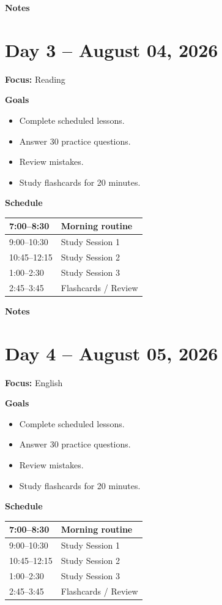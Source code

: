 \vspace{1em}
\textbf{Notes}

\vspace{8cm}

\newpage

\section*{Day 3 -- August 04, 2026}
\textbf{Focus:} Reading

\textbf{Goals}
\begin{itemize}
\item Complete scheduled lessons.
\item Answer 30 practice questions.
\item Review mistakes.
\item Study flashcards for 20 minutes.
\end{itemize}

\textbf{Schedule}
\begin{tabular}{|p{4cm}|p{10cm}|}\hline
7:00--8:30 & Morning routine \\\hline
9:00--10:30 & Study Session 1 \\\hline
10:45--12:15 & Study Session 2 \\\hline
1:00--2:30 & Study Session 3 \\\hline
2:45--3:45 & Flashcards / Review \\\hline
\end{tabular}

\vspace{1em}
\textbf{Notes}

\vspace{8cm}

\newpage

\section*{Day 4 -- August 05, 2026}
\textbf{Focus:} English

\textbf{Goals}
\begin{itemize}
\item Complete scheduled lessons.
\item Answer 30 practice questions.
\item Review mistakes.
\item Study flashcards for 20 minutes.
\end{itemize}

\textbf{Schedule}
\begin{tabular}{|p{4cm}|p{10cm}|}\hline
7:00--8:30 & Morning routine \\\hline
9:00--10:30 & Study Session 1 \\\hline
10:45--12:15 & Study Session 2 \\\hline
1:00--2:30 & Study Session 3 \\\hline
2:45--3:45 & Flashcards / Review \\\hline
\end{tabular}

